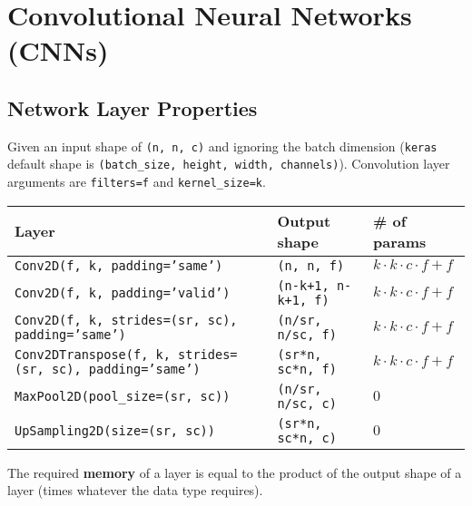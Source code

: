 
\section{Convolutional Neural Networks (CNNs)}


\subsection{Network Layer Properties}

Given an input shape of \texttt{(n, n, c)} and ignoring the batch dimension
(\texttt{keras} default shape is \texttt{(batch_size, height, width, channels)}).
Convolution layer arguments are \texttt{filters=f} and \texttt{kernel_size=k}.

\begin{table}[h!]
    \centering
    \begin{tabular}{@{}lll@{}}\toprule
        Layer & Output shape & \# of params\\ \midrule
        \texttt{Conv2D(f, k, padding='same')} &
            \texttt{(n, n, f)} & \(k \cdot k \cdot c \cdot f + f\) \\
        \texttt{Conv2D(f, k, padding='valid')} &
            \texttt{(n-k+1, n-k+1, f)} & \(k \cdot k \cdot c \cdot f + f\) \\
        \texttt{Conv2D(f, k, strides=(sr, sc), padding='same')} &
            \texttt{(n/sr, n/sc, f)} & \(k \cdot k \cdot c \cdot f + f\) \\
        \texttt{Conv2DTranspose(f, k, strides=(sr, sc), padding='same')} &
            \texttt{(sr*n, sc*n, f)} & \(k \cdot k \cdot c \cdot f + f\) \\
        \texttt{MaxPool2D(pool_size=(sr, sc))} &
            \texttt{(n/sr, n/sc, c)} & \(0\)\\
        \texttt{UpSampling2D(size=(sr, sc))} &
            \texttt{(sr*n, sc*n, c)} & \(0\)\\
        \bottomrule
    \end{tabular}
\end{table}

The required \textbf{memory} of a layer is equal to the product of the output shape of a layer (times whatever the data type requires).

\vspace{3mm}

